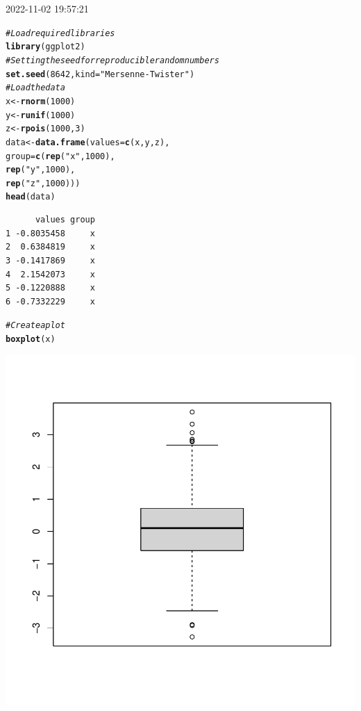\documentclass{article}\usepackage[]{graphicx}\usepackage[]{xcolor}
\makeatletter
\def\maxwidth{ %
  \ifdim\Gin@nat@width>\linewidth
    \linewidth
  \else
    \Gin@nat@width
  \fi
}
\newcommand{\hlnum}[1]{\textcolor[rgb]{0.686,0.059,0.569}{#1}}%
\newcommand{\hlstr}[1]{\textcolor[rgb]{0.192,0.494,0.8}{#1}}%
\newcommand{\hlcom}[1]{\textcolor[rgb]{0.678,0.584,0.686}{\textit{#1}}}%
\newcommand{\hlstd}[1]{\textcolor[rgb]{0.345,0.345,0.345}{#1}}%
\newcommand{\hlkwb}[1]{\textcolor[rgb]{0.69,0.353,0.396}{#1}}%
\newcommand{\hlkwc}[1]{\textcolor[rgb]{0.333,0.667,0.333}{#1}}%
\newcommand{\hlkwd}[1]{\textcolor[rgb]{0.737,0.353,0.396}{\textbf{#1}}}%
\newenvironment{kframe}{%
 \def\at@end@of@kframe{}%
 \ifinner\ifhmode%
  \def\at@end@of@kframe{\end{minipage}}%
  \begin{minipage}{\columnwidth}%
 \fi\fi%
 \def\FrameCommand##1{\hskip\@totalleftmargin \hskip-\fboxsep
 \colorbox{shadecolor}{##1}\hskip-\fboxsep
     \hskip-\linewidth \hskip-\@totalleftmargin \hskip\columnwidth}%
 \MakeFramed {\advance\hsize-\width
   \@totalleftmargin\z@ \linewidth\hsize
   \@setminipage}}%
 {\par\unskip\endMakeFramed%
 \at@end@of@kframe}
\newenvironment{knitrout}{}{} %
\makeatother
\begin{document}


2022-11-02 19:57:21
\begin{knitrout}
\color{fgcolor}\begin{kframe}
\begin{alltt}
\hlcom{# Load required libraries}
\hlkwd{library}\hlstd{(ggplot2)}
\hlcom{# Setting the seed for reproducible random numbers}
\hlkwd{set.seed}\hlstd{(}\hlnum{8642}\hlstd{,} \hlkwc{kind} \hlstd{=} \hlstr{"Mersenne-Twister"}\hlstd{)}
\hlcom{# Load the data}
\hlstd{x} \hlkwb{<-} \hlkwd{rnorm}\hlstd{(}\hlnum{1000}\hlstd{)}
\hlstd{y} \hlkwb{<-} \hlkwd{runif}\hlstd{(}\hlnum{1000}\hlstd{)}
\hlstd{z} \hlkwb{<-} \hlkwd{rpois}\hlstd{(}\hlnum{1000}\hlstd{,} \hlnum{3}\hlstd{)}
\hlstd{data} \hlkwb{<-} \hlkwd{data.frame}\hlstd{(}\hlkwc{values} \hlstd{=} \hlkwd{c}\hlstd{(x, y, z),}
                   \hlkwc{group} \hlstd{=} \hlkwd{c}\hlstd{(}\hlkwd{rep}\hlstd{(}\hlstr{"x"}\hlstd{,} \hlnum{1000}\hlstd{),}
                             \hlkwd{rep}\hlstd{(}\hlstr{"y"}\hlstd{,} \hlnum{1000}\hlstd{),}
                             \hlkwd{rep}\hlstd{(}\hlstr{"z"}\hlstd{,} \hlnum{1000}\hlstd{)))}
\hlkwd{head}\hlstd{(data)}
\end{alltt}
\begin{verbatim}
      values group
1 -0.8035458     x
2  0.6384819     x
3 -0.1417869     x
4  2.1542073     x
5 -0.1220888     x
6 -0.7332229     x
\end{verbatim}
\begin{alltt}
\hlcom{# Create a plot}
\hlkwd{boxplot}\hlstd{(x)}
\end{alltt}
\end{kframe}

{\centering \includegraphics[width=\maxwidth]{figure/unnamed-chunk-1-1} 

}
\end{knitrout}
\end{document}
